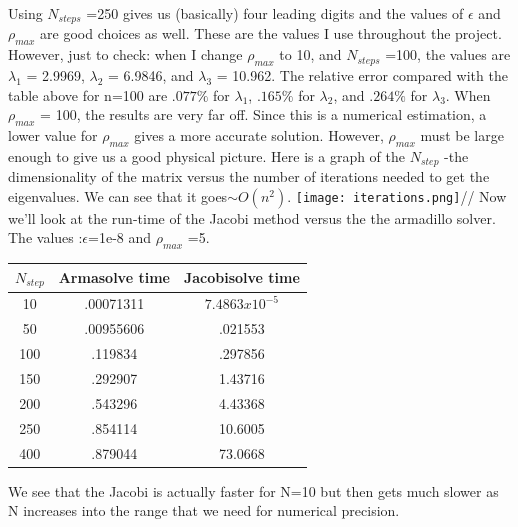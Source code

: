 \documentclass[11pt,a4wide]{article}
\begin{document}
\begin{enumerate}
Using $N_{steps}$ =250 gives us (basically) four leading digits and the values of $\epsilon$ and $\rho_{max}$ are good choices as well. These are the values I use throughout the project. However, just to check: when I change $\rho_{max}$ to 10, and $N_{steps}$ =100, the values are $\lambda_{1}$ = 2.9969, $\lambda_{2}$ = 6.9846, and $\lambda_{3}$ = 10.962. The relative error compared with the table above for n=100 are $.077\%$ for $\lambda_{1}$, $.165\%$ for $\lambda_{2}$, and $.264\%$ for $\lambda_{3}$. When $\rho_{max}$ = 100, the results are very far off. Since this is a numerical estimation, a lower value for  $\rho_{max}$ gives a more accurate solution. However, $\rho_{max}$ must be large enough to give us a good physical picture. 
Here is a graph of the $N_{step}$ -the dimensionality of the matrix versus the number of iterations needed to get the eigenvalues. We can see that it goes$\sim O(n^{2})$.
\texttt{[image: iterations.png]}//
Now we'll look at the run-time of the Jacobi method versus the the armadillo solver. The values :$\epsilon$=1e-8 and $\rho_{max}$ =5.  
\begin{center}
    \begin{tabular}{| c | c | c |}
    \hline
   \bf $N_{step}$ & \bf Armasolve time	 & \bf Jacobisolve time \\ \hline
	10 & .00071311	 & $7.4863 x 10^{-5}$  \\ \hline
	50 & .00955606 & .021553   \\ \hline
	100 & .119834 & .297856 \\ \hline
	150 & .292907 & 1.43716   \\ \hline
	200 & .543296 & 4.43368  \\ \hline
	250 & .854114 & 10.6005	 \\ \hline
	400 & .879044 & 73.0668	 \\ 
	 \hline	
    \end{tabular}
\end{center}
We see that the Jacobi is actually faster for N=10 but then gets much slower as N increases into the range that we need for numerical precision. 



\end{enumerate}
\end{document}
